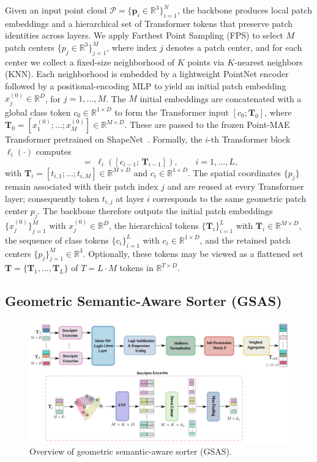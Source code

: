Given an input point cloud \(\mathcal{P} = \{\mathbf{p}_i\in\mathbb{R}^3\}_{i=1}^N\), the backbone produces local patch embeddings and a hierarchical set of Transformer tokens that preserve patch identities across layers. We apply Farthest Point Sampling (FPS) to select \(M\) patch centers \(\{p_j\in\mathbb{R}^3\}_{j=1}^M\), where index \(j\) denotes a patch center, and for each center we collect a fixed-size neighborhood of \(K\) points via \(K\)-nearest neighbors (KNN). Each neighborhood is embedded by a lightweight PointNet encoder followed by a positional-encoding MLP to yield an initial patch embedding \(x_j^{(0)}\in\mathbb{R}^D\), for \(j=1,\dots,M\). The \(M\) initial embeddings are concatenated with a global class token \(c_0\in\mathbb{R}^{1\times D}\) to form the Transformer input \([c_0;\mathbf{T}_0]\), where \(\mathbf{T}_0=[x_1^{(0)};\dots;x_M^{(0)}]\in\mathbb{R}^{M\times D}\). These are passed to the frozen Point-MAE Transformer pretrained on ShapeNet~\cite{pang2022masked,chang2015shapenet}. Formally, the \(i\)-th Transformer block \(\ell_i(\cdot)\) computes
\begin{equation}
[c_i;\,\mathbf{T}_i] \;=\; \ell_i([c_{i-1};\,\mathbf{T}_{i-1}]), \qquad i=1,\dots,L,
\end{equation}
with \(\mathbf{T}_i=[t_{i,1};\dots;t_{i,M}]\in\mathbb{R}^{M\times D}\) and \(c_i\in\mathbb{R}^{1\times D}\). The spatial coordinates \(\{p_j\}\) remain associated with their patch index \(j\) and are reused at every Transformer layer; consequently token \(t_{i,j}\) at layer \(i\) corresponds to the same geometric patch center \(p_j\). The backbone therefore outputs the initial patch embeddings \(\{x_j^{(0)}\}_{j=1}^M\) with \(x_j^{(0)}\in\mathbb{R}^D\), the hierarchical tokens \(\{\mathbf{T}_i\}_{i=1}^L\) with \(\mathbf{T}_i\in\mathbb{R}^{M\times D}\), the sequence of class tokens \(\{c_i\}_{i=1}^L\) with \(c_i\in\mathbb{R}^{1\times D}\), and the retained patch centers \(\{p_j\}_{j=1}^M\in\mathbb{R}^3\). Optionally, these tokens may be viewed as a flattened set \(\mathbf{T}=\{\mathbf{T}_1,\dots,\mathbf{T}_L\}\) of \(T=L\cdot M\) tokens in \(\mathbb{R}^{T\times D}\).

\subsection{Geometric Semantic-Aware Sorter (GSAS)}
\label{sec:gsas}

\begin{figure}[h!]
  \centering 
    \includegraphics[width=0.98\linewidth]{figs/GSAS}
  \caption{Overview of geometric semantic-aware sorter (GSAS).}
  \label{fig:GSAS}
\end{figure}

